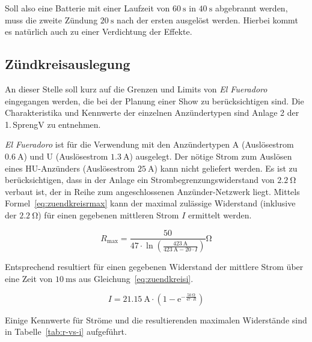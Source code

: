 \documentclass[paper=a4, parskip, numbers=noenddot, toc=listof, headsepline]{scrbook}
\newcommand{\anlage}{\emph{El Fueradoro}}
\begin{document}
				Soll also eine Batterie mit einer Laufzeit von $\SI{60}{\second}$ in $\SI{40}{\second}$ abgebrannt werden, muss die zweite Zündung $\SI{20}{\second}$ nach der ersten ausgelöst werden. Hierbei kommt es natürlich auch zu einer Verdichtung der Effekte.

			\subsection{Zündkreisauslegung}

				An dieser Stelle soll kurz auf die Grenzen und Limits von {\anlage} eingegangen werden, die bei der Planung einer Show zu berücksichtigen sind. Die Charakteristika und Kennwerte der einzelnen Anzündertypen sind Anlage 2 der 1.\,SprengV zu entnehmen.

				{\anlage} ist für die Verwendung mit den Anzündertypen A (Auslösestrom $\SI{0,6}{\ampere}$) und U (Auslösestrom $\SI{1,3}{\ampere}$) ausgelegt. Der nötige Strom zum Auslösen eines HU-Anzünders (Auslösestrom $\SI{25}{\ampere}$) kann nicht geliefert werden. Es ist zu berücksichtigen, dass in der Anlage ein Strombegrenzungswiderstand von $\SI{2,2}{\ohm}$ verbaut ist, der in Reihe zum angeschlossenen Anzünder-Netzwerk liegt. Mittels Formel~\eqref{eq:zuendkreisrmax} kann der maximal zulässige Widerstand (inklusive der $\SI{2,2}{\ohm}$) für einen gegebenen mittleren Strom $I$ ermittelt werden.

				\begin{equation}
					R_\text{max} = \frac{50}{47 {\cdot} \ln\left(\frac{\SI{423}{\ampere}}{\SI{423}{\ampere} - 20 {\cdot} I}\right)}\si{\ohm}
					\label{eq:zuendkreisrmax}
				\end{equation}

				Entsprechend resultiert für einen gegebenen Widerstand der mittlere Strom über eine Zeit von $\SI{10}{\milli\second}$ aus Gleichung~\eqref{eq:zuendkreisi}.

				\begin{equation}
					I = \SI{21,15}{\ampere} {\cdot} \left(1 - \mathrm{e}^{-\frac{\SI{50}{\ohm}}{47 {\cdot} R}}\right)
					\label{eq:zuendkreisi}
				\end{equation}

				Einige Kennwerte für Ströme und die resultierenden maximalen Widerstände sind in Tabelle~\ref{tab:r-vs-i} aufgeführt.
\end{document}
